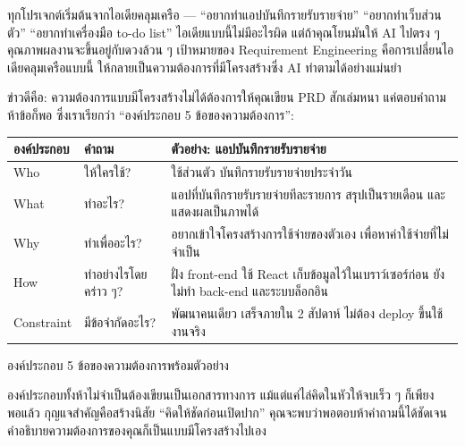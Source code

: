 


ทุกโปรเจกต์เริ่มต้นจากไอเดียคลุมเครือ — “อยากทำแอปบันทึกรายรับรายจ่าย” “อยากทำเว็บส่วนตัว” “อยากทำเครื่องมือ to-do list” ไอเดียแบบนี้ไม่มีอะไรผิด แต่ถ้าคุณโยนมันให้ AI ไปตรง ๆ คุณภาพผลงานจะขึ้นอยู่กับดวงล้วน ๆ เป้าหมายของ Requirement Engineering คือการเปลี่ยนไอเดียคลุมเครือแบบนี้ ให้กลายเป็นความต้องการที่มีโครงสร้างซึ่ง AI ทำตามได้อย่างแม่นยำ

ข่าวดีคือ: ความต้องการแบบมีโครงสร้างไม่ได้ต้องการให้คุณเขียน PRD สักเล่มหนา แค่ตอบคำถามห้าข้อก็พอ ซึ่งเราเรียกว่า “องค์ประกอบ 5 ข้อของความต้องการ”:

\begin{center}
\begin{tabularx}{\linewidth}{|X|X|X|}
\hline
\textbf{องค์ประกอบ} & \textbf{คำถาม} & \textbf{ตัวอย่าง: แอปบันทึกรายรับรายจ่าย} \tabularnewline
\hline
Who & ให้ใครใช้? & ใช้ส่วนตัว บันทึกรายรับรายจ่ายประจำวัน \tabularnewline
What & ทำอะไร? & แอปที่บันทึกรายรับรายจ่ายทีละรายการ สรุปเป็นรายเดือน และแสดงผลเป็นภาพได้ \tabularnewline
Why & ทำเพื่ออะไร? & อยากเข้าใจโครงสร้างการใช้จ่ายของตัวเอง เพื่อหาค่าใช้จ่ายที่ไม่จำเป็น \tabularnewline
How & ทำอย่างไรโดยคร่าว ๆ? & ฝั่ง front-end ใช้ React เก็บข้อมูลไว้ในเบราว์เซอร์ก่อน ยังไม่ทำ back-end และระบบล็อกอิน \tabularnewline
Constraint & มีข้อจำกัดอะไร? & พัฒนาคนเดียว เสร็จภายใน 2 สัปดาห์ ไม่ต้อง deploy ขึ้นใช้งานจริง \tabularnewline
\hline
\end{tabularx}
\end{center}

\begin{center}\small\color{gray}องค์ประกอบ 5 ข้อของความต้องการพร้อมตัวอย่าง\end{center}

องค์ประกอบทั้งห้าไม่จำเป็นต้องเขียนเป็นเอกสารทางการ แม้แต่แค่ไล่คิดในหัวให้จบเร็ว ๆ ก็เพียงพอแล้ว กุญแจสำคัญคือสร้างนิสัย “คิดให้ชัดก่อนเปิดปาก” คุณจะพบว่าพอตอบห้าคำถามนี้ได้ชัดเจน คำอธิบายความต้องการของคุณก็เป็นแบบมีโครงสร้างไปเอง


